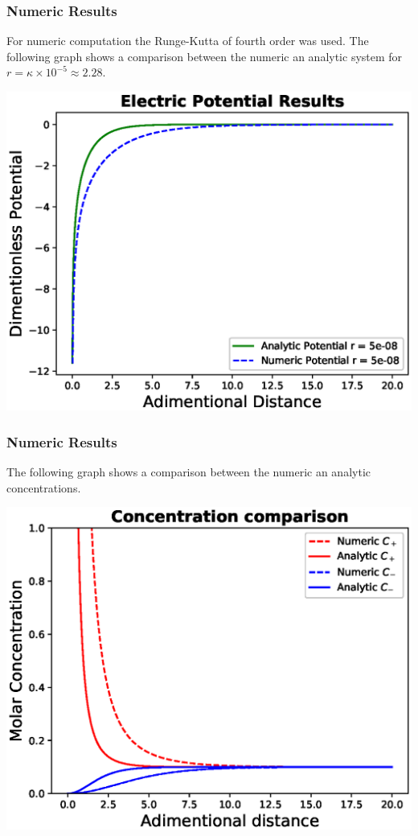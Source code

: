 \documentclass{beamer}
\begin{document}
\begin{frame}
\frametitle{Numeric Results}
For numeric computation the Runge-Kutta of fourth order was used.  The following graph shows a comparison between the numeric an analytic system for $r = \kappa \times 10^{-5}\approx 2.28$.
\begin{center}
\includegraphics[width=0.7\linewidth]{potential-results.eps}
\end{center}

\end{frame}

\begin{frame}
\frametitle{Numeric Results}
The following graph shows a comparison between the numeric an analytic concentrations.
\begin{center}
\includegraphics[width=0.7\linewidth]{Concentration-results.eps}
\end{center}
\end{frame}
\end{document}
